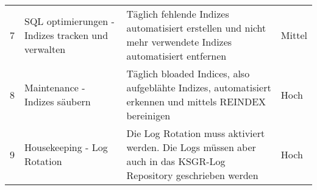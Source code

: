 \begin{flushleft}
\begin{table}[H]
{\begin{tabular}{@{}llll@{}}
7            & SQL optimierungen - Indizes tracken und verwalten & Täglich fehlende Indizes automatisiert erstellen und nicht mehr verwendete Indizes automatisiert entfernen                                                                                                                                                                                                                                                                                                                                                                                                                                                                                                                                                                                                                                                                                                                                                                           & Mittel             \\
8            & Maintenance - Indizes säubern                     & Täglich bloaded Indices, also aufgeblähte Indizes, automatisiert erkennen und mittels REINDEX bereinigen                                                                                                                                                                                                                                                                                                                                                                                                                                                                                                                                                                                                                                                                                                                                                                             & Hoch               \\
9            & Housekeeping - Log Rotation                       & Die Log Rotation muss aktiviert werden. Die Logs müssen aber auch in das KSGR-Log Repository geschrieben werden                                                                                                                                                                                                                                                                                                                                                                                                                                                                                                                                                                                                                                                                                                                                                                      & Hoch               \\

\end{tabular}}
\end{table}
\end{flushleft}

